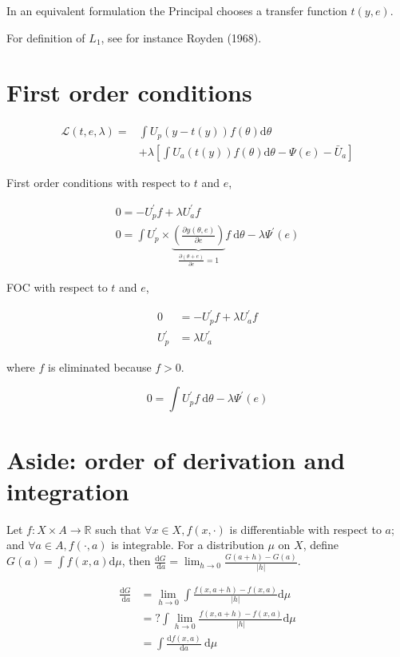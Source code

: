 \documentclass[10pt]{article}
\begin{document}
In an equivalent formulation the Principal chooses a transfer function $t(y, e)$.

For definition of $L_{1}$, see for instance Royden (1968).

\section*{First order conditions}
$$
\begin{aligned}
\mathcal{L}(t, e, \lambda)= & \int U_{p}(y-t(y)) f(\theta) \mathrm{d} \theta \\
& +\lambda\left[\int U_{a}(t(y)) f(\theta) \mathrm{d} \theta-\Psi(e)-\bar{U}_{a}\right]
\end{aligned}
$$

First order conditions with respect to $t$ and $e$,


\begin{gather*}
0=-U_{p}^{\prime} f+\lambda U_{a}^{\prime} f  \tag{1}\\
0=\int U_{p}^{\prime} \times \underbrace{\left(\frac{\partial y(\theta, e)}{\partial e}\right)}_{\frac{\partial(\theta+e)}{\partial e}=1} f \mathrm{~d} \theta-\lambda \Psi^{\prime}(e) \tag{2}
\end{gather*}


FOC with respect to $t$ and $e$,

$$
\begin{aligned}
0 & =-U_{p}^{\prime} f+\lambda U_{a}^{\prime} f \\
U_{p}^{\prime} & =\lambda U_{a}^{\prime}
\end{aligned}
$$

where $f$ is eliminated because $f>0$.

$$
0=\int U_{p}^{\prime} f \mathrm{~d} \theta-\lambda \Psi^{\prime}(e)
$$

\section*{Aside: order of derivation and integration}
Let $f: X \times A \rightarrow \mathbb{R}$ such that $\forall x \in X, f(x, \cdot)$ is differentiable with respect to $a$; and $\forall a \in A, f(\cdot, a)$ is integrable. For a distribution $\mu$ on $X$, define $G(a)=\int f(x, a) \mathrm{d} \mu$, then $\frac{\mathrm{d} G}{\mathrm{~d} a}=\lim _{h \rightarrow 0} \frac{G(a+h)-G(a)}{|h|}$.

$$
\begin{aligned}
\frac{\mathrm{d} G}{\mathrm{~d} a} & =\lim _{h \rightarrow 0} \int \frac{f(x, a+h)-f(x, a)}{|h|} \mathrm{d} \mu \\
& =? \int \lim _{h \rightarrow 0} \frac{f(x, a+h)-f(x, a)}{|h|} \mathrm{d} \mu \\
& =\int \frac{\mathrm{d} f(x, a)}{\mathrm{d} a} \mathrm{~d} \mu
\end{aligned}
$$
\end{document}
